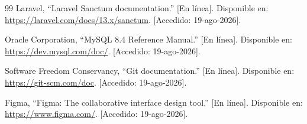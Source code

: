 \documentclass[12pt]{article}
\begin{document}
\begin{thebibliography}{99}
 Laravel, ``Laravel Sanctum documentation.'' [En línea]. Disponible en: \url{https://laravel.com/docs/13.x/sanctum}. [Accedido: 19-ago-2026].

 Oracle Corporation, ``MySQL 8.4 Reference Manual.'' [En línea]. Disponible en: \url{https://dev.mysql.com/doc/}. [Accedido: 19-ago-2026].

 Software Freedom Conservancy, ``Git documentation.'' [En línea]. Disponible en: \url{https://git-scm.com/doc}. [Accedido: 19-ago-2026].

 Figma, ``Figma: The collaborative interface design tool.'' [En línea]. Disponible en: \url{https://www.figma.com/}. [Accedido: 19-ago-2026].
\end{thebibliography}
\end{document}
